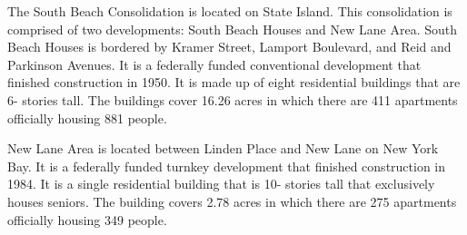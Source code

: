 The South Beach Consolidation is located on State Island. This consolidation is comprised of two developments: South Beach Houses and New Lane Area. South Beach Houses is bordered by Kramer Street, Lamport Boulevard, and Reid and Parkinson Avenues. It is a federally funded conventional development that finished construction in 1950. It is made up of eight residential buildings that are 6- stories tall. The buildings cover 16.26 acres in which there are 411 apartments officially housing 881 people.  \par \vspace{.7\baselineskip}New Lane Area is located between Linden Place and New Lane on New York Bay. It is a federally funded turnkey development that finished construction in 1984. It is a single residential building that is 10- stories tall that exclusively houses seniors. The building covers 2.78 acres in which there are 275 apartments officially housing 349 people.
